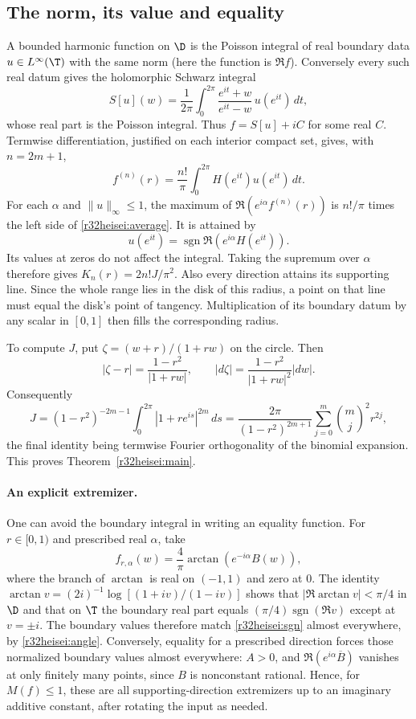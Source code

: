 \documentclass[11pt,a4paper]{article}
\numberwithin{equation}{section}
\theoremstyle{definition}
\theoremstyle{remark}
\begin{document}
\subsection{The norm, its value and equality}
A bounded harmonic function on $\D$ is the Poisson integral of real boundary data $u\in L^\infty(\T)$ with the same norm (here the function is $\Re f$). Conversely every such real datum gives the holomorphic Schwarz integral
\[
 S[u](w)=\frac1{2\pi}\int_0^{2\pi}
    \frac{e^{it}+w}{e^{it}-w}\,u(e^{it})\,dt,
\]
whose real part is the Poisson integral. Thus $f=S[u]+iC$ for some real $C$. Termwise differentiation, justified on each interior compact set, gives, with $n=2m+1$,
\[
 f^{(n)}(r)=\frac{n!}{\pi}\int_0^{2\pi} H(e^{it})u(e^{it})\,dt.
\]
For each $\alpha$ and $\|u\|_\infty\le1$, the maximum of $\Re(e^{i\alpha}f^{(n)}(r))$ is $n!/\pi$ times the left side of \eqref{r32heisei:average}. It is attained by
\begin{equation}\label{r32heisei:sgn}
 u(e^{it})=\operatorname{sgn}\Re(e^{i\alpha}H(e^{it})).
\end{equation}
Its values at zeros do not affect the integral. Taking the supremum over $\alpha$ therefore gives $K_n(r)=2n!J/\pi^2$. Also every direction attains its supporting line. Since the whole range lies in the disk of this radius, a point on that line must equal the disk's point of tangency. Multiplication of its boundary datum by any scalar in $[0,1]$ then fills the corresponding radius.

To compute $J$, put $\zeta=(w+r)/(1+rw)$ on the circle. Then
\[
 |\zeta-r|=\frac{1-r^2}{|1+rw|},\qquad
 |d\zeta|=\frac{1-r^2}{|1+rw|^2}|dw|.
\]
Consequently
\[
 J=(1-r^2)^{-2m-1}\int_0^{2\pi}|1+re^{is}|^{2m}\,ds
  =\frac{2\pi}{(1-r^2)^{2m+1}}\sum_{j=0}^m\binom{m}{j}^{\!2}r^{2j},
\]
the final identity being termwise Fourier orthogonality of the binomial expansion. This proves Theorem~\ref{r32heisei:main}.

\paragraph{An explicit extremizer.}
One can avoid the boundary integral in writing an equality function. For $r\in[0,1)$ and prescribed real $\alpha$, take
\[
 f_{r,\alpha}(w)=\frac4\pi\arctan\!\left(e^{-i\alpha}B(w)\right),
\]
where the branch of $\arctan$ is real on $(-1,1)$ and zero at $0$. The identity
$\arctan v=(2i)^{-1}\log[(1+iv)/(1-iv)]$ shows that $|\Re\arctan v|<\pi/4$ in $\D$ and that on $\T$ the boundary real part equals $(\pi/4)\operatorname{sgn}(\Re v)$ except at $v=\pm i$. The boundary values therefore match \eqref{r32heisei:sgn} almost everywhere, by \eqref{r32heisei:angle}. Conversely, equality for a prescribed direction forces those normalized boundary values almost everywhere: $A>0$, and $\Re(e^{i\alpha}\overline B)$ vanishes at only finitely many points, since $B$ is nonconstant rational. Hence, for $M(f)\le1$, these are all supporting-direction extremizers up to an imaginary additive constant, after rotating the input as needed.
\end{document}
